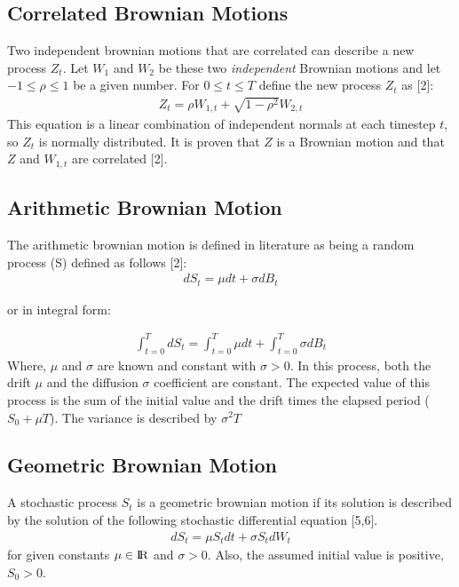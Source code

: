 \documentclass[12pt,twoside]{reedthesis}
\theoremstyle{definition}
\theoremstyle{definition}
\theoremstyle{remark}
\begin{document}
  \subsection{Correlated Brownian Motions}\label{corr}
  
  Two independent brownian motions that are correlated can describe a new
  process \(Z_t\). Let \(W_1\) and \(W_2\) be these two \emph{independent}
  Brownian motions and let \(-1 \leq \rho \leq 1\) be a given number. For
  \(0 \leq t \leq T\) define the new process \(Z_t\) as {[}2{]}:
  \begin{align}
  \label{eq:corr_brow}
  Z_t = \rho W_{1,t} + \sqrt{1-\rho^2}W_{2,t}
  \end{align}
  \noindent
  This equation is a linear combination of independent normals at each
  timestep \(t\), so \(Z_t\) is normally distributed. It is proven that
  \(Z\) is a Brownian motion and that \(Z\) and \(W_{1,t}\) are correlated
  {[}2{]}.
  
  \subsection{Arithmetic Brownian
  Motion}\label{arithmetic-brownian-motion}
  
  The arithmetic brownian motion is defined in literature as being a
  random process (S) defined as follows {[}2{]}:
  \begin{align}
  dS_t = \mu dt + \sigma dB_t
  \end{align}
  \begin{center}or in integral form:\end{center}
  \begin{align}
  \int_{t=0}^{T} dS_t = \int_{t=0}^{T}{\mu dt} + \int_{t=0}^{T}{\sigma dB_t}
  \end{align}
  \noindent
  Where, \(\mu\) and \(\sigma\) are known and constant with
  \(\sigma > 0\). In this process, both the drift \(\mu\) and the
  diffusion \(\sigma\) coefficient are constant. The expected value of
  this process is the sum of the initial value and the drift times the
  elapsed period (\(S_0 + \mu T\)). The variance is described by
  \(\sigma^2 T\)
  
  \subsection{Geometric Brownian Motion}\label{geometric-brownian-motion}
  
  A stochastic process \(S_t\) is a geometric brownian motion if its
  solution is described by the solution of the following stochastic
  differential equation {[}5,6{]}.
  \begin{align}
  dS_t = \mu S_t dt + \sigma S_t dW_t
  \end{align}
  \noindent
  for given constants \(\mu \in {\rm I\!R}\) and \(\sigma > 0\). Also, the
  assumed initial value is positive, \(S_0 >0\).
  
\end{document}
